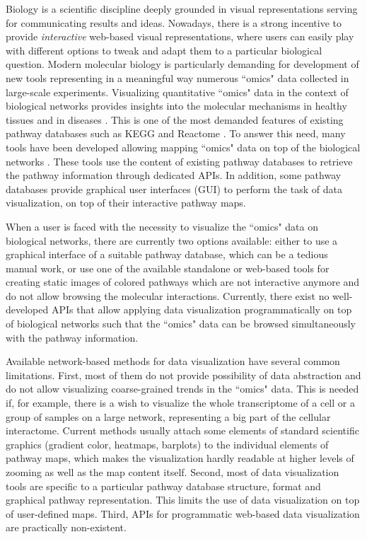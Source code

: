 \documentclass[a4,center,fleqn]{NAR}
\begin{document}
Biology is a scientific discipline deeply grounded in visual representations
serving for communicating results and ideas. Nowadays, there is a strong
incentive to provide \emph{interactive} web-based visual representations, where
users can easily play with different options to tweak and adapt them to a particular biological question. Modern
molecular biology is particularly demanding for development of new tools
representing in a meaningful way numerous ``omics" data collected in
large-scale experiments. Visualizing quantitative ``omics" data in the context
of biological networks provides insights into the molecular mechanisms in
healthy tissues and in diseases \cite{Gehlenborg2010,Barillot2012}. This is one of
the most demanded features of existing pathway databases such as KEGG
and Reactome \cite{Kanehisa2012, Croft2014}. To answer this need, many tools
have been developed allowing mapping ``omics" data on top of the biological
networks \cite{Arakawa2005,vanIersel2008,Luo2013, Nishida2014}. These tools use
the content of existing pathway databases to retrieve the pathway information
through dedicated APIs. In addition, some pathway databases provide graphical
user interfaces (GUI) to perform the task of data visualization, on top of
their interactive pathway maps.

When a user is faced with the necessity to visualize the ``omics" data on
biological networks, there are currently two options available: either to use
a graphical interface of a suitable pathway database, which can be a tedious manual work, or use
one of the available standalone or web-based tools for creating static images
of colored pathways which are not interactive anymore and do not allow browsing
the molecular interactions. Currently, there exist no well-developed APIs
that allow applying data visualization programmatically on top of biological
networks such that the ``omics" data can be browsed simultaneously with the
pathway information.

Available network-based methods for data visualization have several common
limitations. First, most of them do not provide possibility of data
abstraction and do not allow visualizing coarse-grained trends in the ``omics" data.
This is needed if, for example, there is a wish to visualize the whole
transcriptome of a cell or a group of samples on a large network,
representing a big part of the cellular interactome. Current methods usually attach
some elements of standard scientific graphics (gradient color, heatmaps,
barplots) to the individual elements of pathway maps, which makes the
visualization hardly readable at higher levels of zooming as well as the map
content itself. Second, most of data visualization tools are specific to a
particular pathway database structure, format and graphical pathway
representation. This limits the use of data visualization on top of
user-defined maps. Third, APIs for programmatic web-based data
visualization are practically non-existent.
\end{document}
